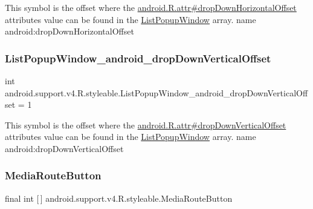 This symbol is the offset where the \hyperlink{}{android.\+R.\+attr\#drop\+Down\+Horizontal\+Offset} attribute\textquotesingle{}s value can be found in the \hyperlink{classandroid_1_1support_1_1v4_1_1R_1_1styleable_ae85d6bb2c9931c00d078ecfff851c634}{List\+Popup\+Window} array.  name android\+:drop\+Down\+Horizontal\+Offset \mbox{\label{classandroid_1_1support_1_1v4_1_1R_1_1styleable_a54cc42e9f9c914a25d69d42af01dc638}} 
\subsubsection{\texorpdfstring{List\+Popup\+Window\+\_\+android\+\_\+drop\+Down\+Vertical\+Offset}{ListPopupWindow\_android\_dropDownVerticalOffset}}
{\footnotesize\ttfamily int android.\+support.\+v4.\+R.\+styleable.\+List\+Popup\+Window\+\_\+android\+\_\+drop\+Down\+Vertical\+Offset = 1\hspace{0.3cm}{\ttfamily [static]}}

This symbol is the offset where the \hyperlink{}{android.\+R.\+attr\#drop\+Down\+Vertical\+Offset} attribute\textquotesingle{}s value can be found in the \hyperlink{classandroid_1_1support_1_1v4_1_1R_1_1styleable_ae85d6bb2c9931c00d078ecfff851c634}{List\+Popup\+Window} array.  name android\+:drop\+Down\+Vertical\+Offset \mbox{\label{classandroid_1_1support_1_1v4_1_1R_1_1styleable_ae8d0883da61f12dee4f79a15ab16cd9b}} 
\subsubsection{\texorpdfstring{Media\+Route\+Button}{MediaRouteButton}}
{\footnotesize\ttfamily final int \mbox{[}$\,$\mbox{]} android.\+support.\+v4.\+R.\+styleable.\+Media\+Route\+Button\hspace{0.3cm}{\ttfamily [static]}}

